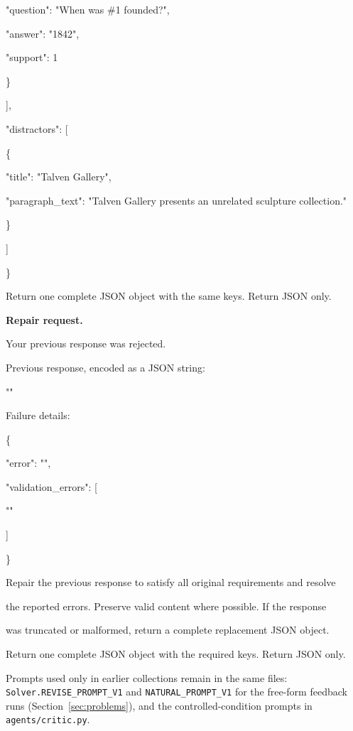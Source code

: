 \begin{promptbox}
\hspace*{3em}"question": "When was \#1 founded?",\par
\hspace*{3em}"answer": "1842",\par
\hspace*{3em}"support": 1\par
\hspace*{2em}\}\par
\hspace*{1em}],\par
\hspace*{1em}"distractors": [\par
\hspace*{2em}\{\par
\hspace*{3em}"title": "Talven Gallery",\par
\hspace*{3em}"paragraph\_text": "Talven Gallery presents an unrelated sculpture collection."\par
\hspace*{2em}\}\par
\hspace*{1em}]\par
\}\par
\promptblank
Return one complete JSON object with the same keys. Return JSON only.\par
\promptblank
\end{promptbox}

\medskip\noindent\textbf{Repair request.}

\begin{promptbox}
\par
\promptblank
Your previous response was rejected.\par
\promptblank
Previous response, encoded as a JSON string:\par
""\par
\promptblank
Failure details:\par
\{\par
\hspace*{1em}"error": "",\par
\hspace*{1em}"validation\_errors": [\par
\hspace*{2em}""\par
\hspace*{1em}]\par
\}\par
\promptblank
Repair the previous response to satisfy all original requirements and resolve\par
the reported errors. Preserve valid content where possible. If the response\par
was truncated or malformed, return a complete replacement JSON object.\par
Return one complete JSON object with the required keys. Return JSON only.\par
\promptblank
\end{promptbox}

Prompts used only in earlier collections remain in the same files:
\texttt{Solver.REVISE\_PROMPT\_V1} and \texttt{NATURAL\_PROMPT\_V1} for the
free-form feedback runs (Section~\ref{sec:problems}), and the
controlled-condition prompts in \texttt{agents/critic.py}.
